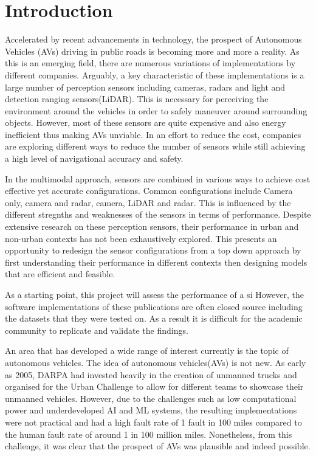 %
%
\let\textcircled=\pgftextcircled
\chapter{Introduction}
\label{chap:intro}

Accelerated by recent advancements in technology, the prospect of Autonomous Vehicles (AVs) driving in public roads is becoming more and more a reality. As this is an emerging field, there are numerous variations of implementations by different companies. Arguably, a key characteristic of these implementations is a large number of perception sensors including cameras, radars and light and detection ranging sensors(LiDAR). This is necessary for perceiving the environment around the vehicles in order to safely maneuver around surrounding objects. However, most of these sensors are quite expensive and also energy inefficient thus making AVs unviable. In an effort to reduce the cost, companies are exploring different ways to reduce the number of sensors while still achieving a high level of navigational accuracy and safety.
 
In the multimodal approach, sensors are combined in various ways to achieve  cost effective yet accurate configurations. Common configurations include Camera only, camera and radar, camera, LiDAR and radar. This is influenced by the different stregnths and weaknesses of the sensors in terms of performance.  
Despite extensive research on these perception sensors, their performance  in urban and non-urban contexts has not been exhaustively explored. This presents an opportunity to redesign the sensor configurations from a top down approach by first understanding their performance in different contexts then designing models that are efficient and feasible.

As a starting point, this project will assess the performance of a si
 However, the software implementations of these publications are often closed source including the datasets that they were tested on. As a result it is difficult for the academic community to replicate and validate the findings. 




\newpage

An area that has developed a wide range of interest currently is the topic of autonomous vehicles. The idea of autonomous vehicles(AVs) is not new. As early as 2005, DARPA had invested heavily in the creation of unmanned trucks and organised for the Urban Challenge \cite{buehler2009darpa} to allow for different teams to showcase their unmanned vehicles. However, due to the challenges such as low computational power and underdeveloped AI and ML systems, the resulting implementations were not practical and had a high fault rate of 1 fault in 100 miles compared to the human fault rate of around 1 in 100 million miles. Nonetheless, from this challenge, it was clear that the prospect of AVs was plausible and indeed possible. 

